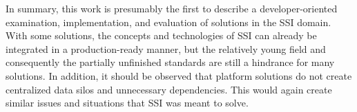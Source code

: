 In summary, this work is presumably the first to describe a developer-oriented examination, implementation, and evaluation of solutions in the \ac{SSI} domain. With some solutions, the concepts and technologies of \ac{SSI} can already be integrated in a production-ready manner, but the relatively young field and consequently the partially unfinished standards are still a hindrance for many solutions. In addition, it should be observed that platform solutions do not create centralized data silos and unnecessary dependencies. This would again create similar issues and situations that \ac{SSI} was meant to solve.



